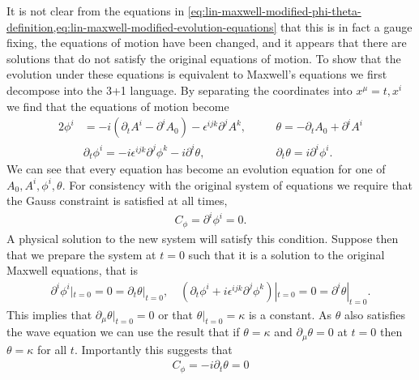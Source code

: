\documentclass[10pt]{report}
\theoremstyle{definition}
\begin{document}
It is not clear from the equations in \cref{eq:lin-maxwell-modified-phi-theta-definition,eq:lin-maxwell-modified-evolution-equations} that this is in fact a gauge fixing, the equations of motion have been changed, and it appears that there are solutions that do not satisfy the original equations of motion. To show that the evolution under these equations is equivalent to Maxwell's equations we first decompose into the 3+1 language. By separating the coordinates into $x^\mu = t,x^i$  we find that the equations of motion become
\begin{alignat}{2}
    \phi^i & = -i(\partial_t A^i - \partial^i A_0) - \epsilon^{ijk} \partial^j A^k, \quad && \theta = -\partial_t A_0 + \partial^i A^i \\ & \partial_t \phi^i = -i \epsilon^{ijk} \partial^j \phi^k - i \partial^i \theta, \quad && \partial_t \theta = i \partial^i \phi^i.
\end{alignat}
We can see that every equation has become an evolution equation for one of $A_0,A^i,\phi^i,\theta$. For consistency with the original system of equations we require that the Gauss constraint is satisfied at all times,
\begin{align}
    C_\phi = \partial^i \phi^i = 0.
\end{align}
A physical solution to the new system will satisfy this condition. Suppose then that we prepare the system at $t = 0$ such that it is a solution to the original Maxwell equations, that is 
\begin{align}
    \partial^i \phi^i |_{t= 0} = 0 = \partial_t \theta|_{t=0}, \quad \left( \partial_t \phi^i + i \epsilon^{ijk} \partial^j \phi^k \right)|_{t=0} = 0 = \partial^i \theta|_{t=0}.
\end{align}
This implies that $\partial_\mu \theta |_{t=0} = 0$ or that $\theta |_{t=0} = \kappa$ is a constant. As $\theta$ also satisfies the wave equation we can use the result that if $\theta = \kappa$ and $\partial_\mu \theta = 0$ at $t = 0$ then $\theta = \kappa$ for all $t$. Importantly this suggests that 
\begin{align}
    C_\phi = -i \partial_t \theta = 0
\end{align}
\end{document}
